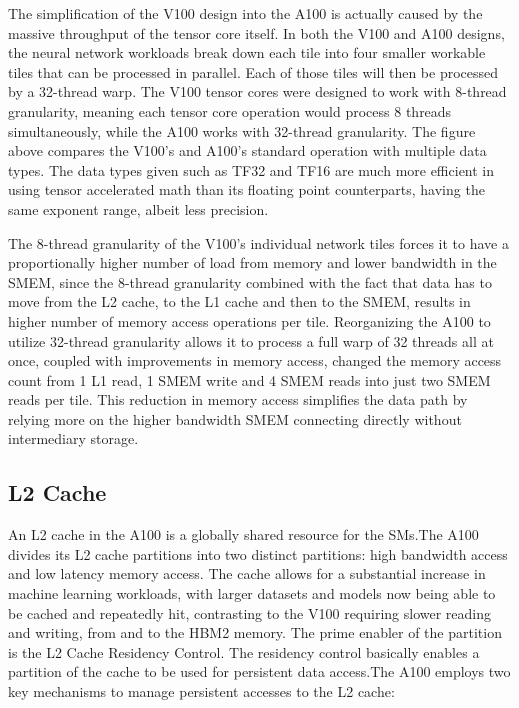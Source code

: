 \documentclass[conference]{IEEEtran}
\begin{document}
    The simplification of the V100 design into the A100 is actually caused by the massive throughput of the tensor core itself.
    In both the V100 and A100 designs, the neural network workloads break down each tile into four smaller workable tiles that can be processed in parallel.
    Each of those tiles will then be processed by a 32-thread warp.
    The V100 tensor cores were designed to work with 8-thread granularity, meaning each tensor core operation would process 8 threads simultaneously, while the A100 works with 32-thread granularity.
    The figure above compares the V100’s and A100’s standard operation with multiple data types.
    The data types given such as TF32 and TF16 are much more efficient in using tensor accelerated math than its floating point counterparts, having the same exponent range, albeit less precision.

    The 8-thread granularity of the V100's individual network tiles forces it to have a proportionally higher number of load from memory and lower bandwidth in the SMEM, since the 8-thread granularity combined with the fact that data has to move from the L2 cache, to the L1 cache and then to the SMEM, results in higher number of memory access operations per tile.
    Reorganizing the A100 to utilize 32-thread granularity allows it to process a full warp of 32 threads all at once, coupled with improvements in memory access, changed the memory access count from 1 L1 read, 1 SMEM write and 4 SMEM reads into just two SMEM reads per tile.
    This reduction in memory access simplifies the data path by relying more on the higher bandwidth SMEM connecting directly without intermediary storage.

    \subsection{L2 Cache}
    An L2 cache in the A100 is a globally shared resource for the SMs.The A100 divides its L2 cache partitions into two distinct partitions: high bandwidth access and low latency memory access.
    The cache allows for a substantial increase in machine learning workloads, with larger datasets and models now being able to be cached and repeatedly hit, contrasting to the V100 requiring slower reading and writing, from and to the HBM2 memory.
    The prime enabler of the partition is the L2 Cache Residency Control.
    The residency control basically enables a partition of the cache to be used for persistent data access.The A100 employs two key mechanisms to manage persistent accesses to the L2 cache:
\end{document}
